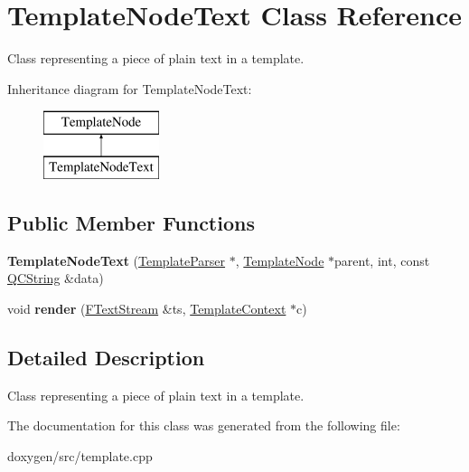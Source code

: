 \hypertarget{class_template_node_text}{}\section{Template\+Node\+Text Class Reference}
\label{class_template_node_text}


Class representing a piece of plain text in a template.  


Inheritance diagram for Template\+Node\+Text\+:\begin{figure}[H]
\begin{center}
\leavevmode
\includegraphics[height=2.000000cm]{class_template_node_text}
\end{center}
\end{figure}
\subsection*{Public Member Functions}
\begin{DoxyCompactItemize}
\item 
\mbox{\label{class_template_node_text_abfbbb434e79f70fc795a006b237c8833}} 
{\bfseries Template\+Node\+Text} (\mbox{\hyperlink{class_template_parser}{Template\+Parser}} $\ast$, \mbox{\hyperlink{class_template_node}{Template\+Node}} $\ast$parent, int, const \mbox{\hyperlink{class_q_c_string}{Q\+C\+String}} \&data)
\item 
\mbox{\label{class_template_node_text_a738c829676cc813d7d66d4f0f3537d3f}} 
void {\bfseries render} (\mbox{\hyperlink{class_f_text_stream}{F\+Text\+Stream}} \&ts, \mbox{\hyperlink{class_template_context}{Template\+Context}} $\ast$c)
\end{DoxyCompactItemize}


\subsection{Detailed Description}
Class representing a piece of plain text in a template. 

The documentation for this class was generated from the following file\+:\begin{DoxyCompactItemize}
\item 
doxygen/src/template.\+cpp\end{DoxyCompactItemize}
